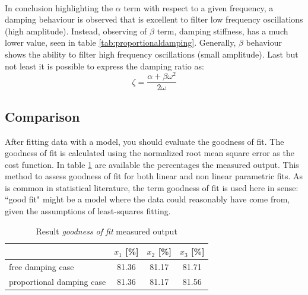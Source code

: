 \\In conclusion highlighting the \(\alpha\) term with respect to a given frequency, 
a damping behaviour is observed that is excellent to filter low frequency 
oscillations (high amplitude).
Instead, observing of  \(\beta\) term, damping stiffness, has a much lower 
value, seen in table \ref{tab:proportionaldamping}. 
Generally, \(\beta\) behaviour shows the ability to filter high frequency 
oscillations (small amplitude).
Last but not least it is possible to express the damping ratio as:
\begin{equation}
\label{eq:dampingratio}
\zeta = \frac{\alpha + \beta \omega^2}{2\omega}
\end{equation}
%
\subsection{Comparison}
\label{subsec:comparison}
After fitting data with a model, you should evaluate the goodness of fit. 
The goodness of fit is calculated using the normalized root mean square error 
as the cost function.
In table \ref{tab:goodoffit} are available the percentages the measured output.
This method to assess goodness of fit for both linear and non linear parametric 
fits.
As is common in statistical literature, the term goodness of fit is used here 
in sense: ``good fit" might be a model where the data could reasonably have 
come from, given the assumptions of least-squares fitting.
\begin{table}[ht]
\centering
\begin{tabular}{lccc}
	\toprule
		 & $x_1$ [\%] & $x_2$ [\%] & $x_3$ [\%]\\
	\midrule
	free damping case & 81.36 & 81.17 & 81.71 \\
	proportional damping case & 81.36 & 81.17 & 81.56 \\
	\bottomrule
\end{tabular}
\caption{Result \emph{goodness of fit} measured output}
\label{tab:goodoffit}
\end{table}
%
